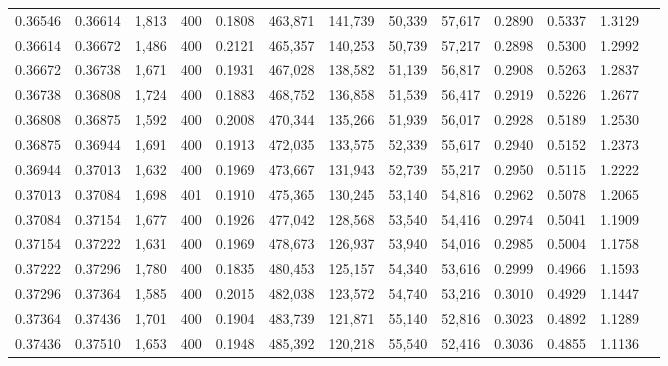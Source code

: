 \begin{tabular}{rrrrrrrrrrrrr}
0.36546 & 0.36614 &  1,813 & 400 &                                     0.1808 & 463,871 & 141,739 &  50,339 &  57,617 & 0.2890 & 0.5337 & 1.3129 \\
0.36614 & 0.36672 &  1,486 & 400 &                                     0.2121 & 465,357 & 140,253 &  50,739 &  57,217 & 0.2898 & 0.5300 & 1.2992 \\
0.36672 & 0.36738 &  1,671 & 400 &                                     0.1931 & 467,028 & 138,582 &  51,139 &  56,817 & 0.2908 & 0.5263 & 1.2837 \\
0.36738 & 0.36808 &  1,724 & 400 &                                     0.1883 & 468,752 & 136,858 &  51,539 &  56,417 & 0.2919 & 0.5226 & 1.2677 \\
0.36808 & 0.36875 &  1,592 & 400 &                                     0.2008 & 470,344 & 135,266 &  51,939 &  56,017 & 0.2928 & 0.5189 & 1.2530 \\
0.36875 & 0.36944 &  1,691 & 400 &                                     0.1913 & 472,035 & 133,575 &  52,339 &  55,617 & 0.2940 & 0.5152 & 1.2373 \\
0.36944 & 0.37013 &  1,632 & 400 &                                     0.1969 & 473,667 & 131,943 &  52,739 &  55,217 & 0.2950 & 0.5115 & 1.2222 \\
0.37013 & 0.37084 &  1,698 & 401 &                                     0.1910 & 475,365 & 130,245 &  53,140 &  54,816 & 0.2962 & 0.5078 & 1.2065 \\
0.37084 & 0.37154 &  1,677 & 400 &                                     0.1926 & 477,042 & 128,568 &  53,540 &  54,416 & 0.2974 & 0.5041 & 1.1909 \\
0.37154 & 0.37222 &  1,631 & 400 &                                     0.1969 & 478,673 & 126,937 &  53,940 &  54,016 & 0.2985 & 0.5004 & 1.1758 \\
0.37222 & 0.37296 &  1,780 & 400 &                                     0.1835 & 480,453 & 125,157 &  54,340 &  53,616 & 0.2999 & 0.4966 & 1.1593 \\
0.37296 & 0.37364 &  1,585 & 400 &                                     0.2015 & 482,038 & 123,572 &  54,740 &  53,216 & 0.3010 & 0.4929 & 1.1447 \\
0.37364 & 0.37436 &  1,701 & 400 &                                     0.1904 & 483,739 & 121,871 &  55,140 &  52,816 & 0.3023 & 0.4892 & 1.1289 \\
0.37436 & 0.37510 &  1,653 & 400 &                                     0.1948 & 485,392 & 120,218 &  55,540 &  52,416 & 0.3036 & 0.4855 & 1.1136 \\

\end{tabular}
